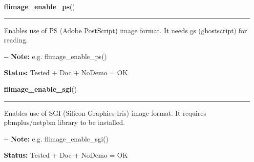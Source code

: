 \hspace{.8\funcindent}\begin{boxedminipage}{\funcwidth}

    \raggedright \textbf{flimage\_enable\_ps}()

    \vspace{-1.5ex}

    \rule{\textwidth}{0.5\fboxrule}
\setlength{\parskip}{2ex}

Enables use of PS (Adobe PostScript) image format. It needs gs
(ghostscript) for reading.

-{}-
\setlength{\parskip}{1ex}
\textbf{Note:} 
e.g. flimage\_enable\_ps()


\textbf{Status:} 
Tested + Doc + NoDemo = OK


    \end{boxedminipage}

    \label{xformslib:flflimage:flimage_enable_sgi}

    \vspace{0.5ex}

\hspace{.8\funcindent}\begin{boxedminipage}{\funcwidth}

    \raggedright \textbf{flimage\_enable\_sgi}()

    \vspace{-1.5ex}

    \rule{\textwidth}{0.5\fboxrule}
\setlength{\parskip}{2ex}

Enables use of SGI (Silicon Graphics-Iris) image format. It requires
pbmplus/netpbm library to be installed.

-{}-
\setlength{\parskip}{1ex}
\textbf{Note:} 
e.g. flimage\_enable\_sgi()


\textbf{Status:} 
Tested + Doc + NoDemo = OK


    \end{boxedminipage}

    \label{xformslib:flflimage:flimage_enable_tiff}

    \vspace{0.5ex}

